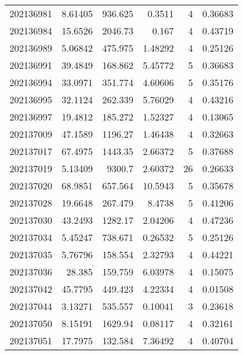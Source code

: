 \begin{tabular}{rrrrrr}
 202136981 &          8.61405 &      936.625  &            0.3511  &           4 & 0.36683 \\
 202136984 &         15.6526  &     2046.73   &            0.167   &           4 & 0.43719 \\
 202136989 &          5.06842 &      475.975  &            1.48292 &           4 & 0.25126 \\
 202136991 &         39.4849  &      168.862  &            5.45772 &           5 & 0.36683 \\
 202136994 &         33.0971  &      351.774  &            4.60606 &           5 & 0.35176 \\
 202136995 &         32.1124  &      262.339  &            5.76029 &           4 & 0.43216 \\
 202136997 &         19.4812  &      185.272  &            1.52327 &           4 & 0.13065 \\
 202137009 &         47.1589  &     1196.27   &            1.46438 &           4 & 0.32663 \\
 202137017 &         67.4975  &     1443.35   &            2.66372 &           5 & 0.37688 \\
 202137019 &          5.13409 &     9300.7    &            2.60372 &          26 & 0.26633 \\
 202137020 &         68.9851  &      657.564  &           10.5943  &           5 & 0.35678 \\
 202137028 &         19.6648  &      267.479  &            8.4738  &           5 & 0.41206 \\
 202137030 &         43.2493  &     1282.17   &            2.04206 &           4 & 0.47236 \\
 202137034 &          5.45247 &      738.671  &            0.26532 &           5 & 0.25126 \\
 202137035 &          5.76796 &      158.554  &            2.32793 &           4 & 0.44221 \\
 202137036 &         28.385   &      159.759  &            6.03978 &           4 & 0.15075 \\
 202137042 &         45.7795  &      449.423  &            4.22334 &           4 & 0.01508 \\
 202137044 &          3.13271 &      535.557  &            0.10041 &           3 & 0.23618 \\
 202137050 &          8.15191 &     1629.94   &            0.08117 &           4 & 0.32161 \\
 202137051 &         17.7975  &      132.584  &            7.36492 &           4 & 0.40704 \\

\end{tabular}

